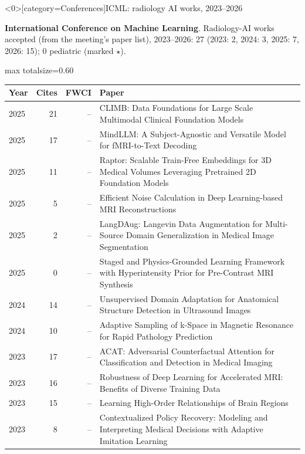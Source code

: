\documentclass[aspectratio=169]{beamer}
\renewcommand{\arraystretch}{1.08}
\begin{document}
\begin{frame}<0>[category=Conferences]{ICML: radiology AI works, 2023--2026}
{\scriptsize \textbf{International Conference on Machine Learning}. Radiology-AI works accepted (from the meeting's paper list), 2023--2026: 27 (2023: 2, 2024: 3, 2025: 7, 2026: 15); 0 pediatric (marked $\star$).\par}\vspace{2pt}
\tiny
\begin{adjustbox}{max totalsize={\textwidth}{0.60\textheight}}
\renewcommand{\arraystretch}{1.2}
\begin{tabular}{|l|r|r|>{\raggedright\arraybackslash}p{}|}
\hline \textbf{Year} & \textbf{Cites} & \textbf{FWCI} & \textbf{Paper} \\ \hline
2025 & 21 & -- & CLIMB: Data Foundations for Large Scale Multimodal Clinical Foundation Models \\ \hline
2025 & 17 & -- & MindLLM: A Subject-Agnostic and Versatile Model for fMRI-to-Text Decoding \\ \hline
2025 & 11 & -- & Raptor: Scalable Train-Free Embeddings for 3D Medical Volumes Leveraging Pretrained 2D Foundation Models \\ \hline
2025 & 5 & -- & Efficient Noise Calculation in Deep Learning-based MRI Reconstructions \\ \hline
2025 & 2 & -- & LangDAug: Langevin Data Augmentation for Multi-Source Domain Generalization in Medical Image Segmentation \\ \hline
2025 & 0 & -- & Staged and Physics-Grounded Learning Framework with Hyperintensity Prior for Pre-Contrast MRI Synthesis \\ \hline
2024 & 14 & -- & Unsupervised Domain Adaptation for Anatomical Structure Detection in Ultrasound Images \\ \hline
2024 & 10 & -- & Adaptive Sampling of k-Space in Magnetic Resonance for Rapid Pathology Prediction \\ \hline
2023 & 17 & -- & ACAT: Adversarial Counterfactual Attention for Classification and Detection in Medical Imaging \\ \hline
2023 & 16 & -- & Robustness of Deep Learning for Accelerated MRI: Benefits of Diverse Training Data \\ \hline
2023 & 15 & -- & Learning High-Order Relationships of Brain Regions \\ \hline
2023 & 8 & -- & Contextualized Policy Recovery: Modeling and Interpreting Medical Decisions with Adaptive Imitation Learning \\ \hline
\end{tabular}
\end{adjustbox}
\\[2pt]
\end{frame}
\end{document}
